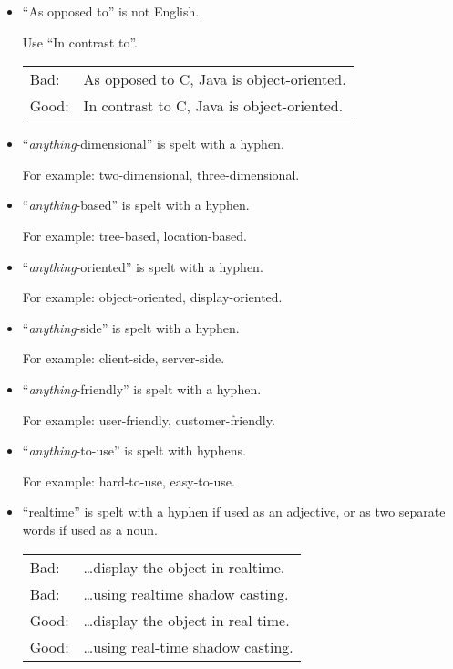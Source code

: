 \begin{itemize}
\item ``As opposed to'' is not English.

Use ``In contrast to''.

\begin{tabular}{lp{0.9\hsize}}
Bad:  & As opposed to C, Java is object-oriented. \\
Good: & In contrast to C, Java is object-oriented. \\
\end{tabular}


\item ``\emph{anything}-dimensional'' is spelt with a hyphen.

For example: two-dimensional, three-dimensional.



\item ``\emph{anything}-based'' is spelt with a hyphen.

For example: tree-based, location-based.



\item ``\emph{anything}-oriented'' is spelt with a hyphen.

For example: object-oriented, display-oriented.


\item ``\emph{anything}-side'' is spelt with a hyphen.

For example: client-side, server-side.


\item ``\emph{anything}-friendly'' is spelt with a hyphen.

For example: user-friendly, customer-friendly.


\item ``\emph{anything}-to-use'' is spelt with hyphens.

For example: hard-to-use, easy-to-use.



\item ``realtime'' is spelt with a hyphen if used as
  an adjective, or as two separate words if used as a noun.

\begin{tabular}{lp{0.9\hsize}}
Bad:  & \ldots display the object in realtime.  \\
Bad:  & \ldots using realtime shadow casting.   \\
Good: & \ldots display the object in real time. \\
Good: & \ldots using real-time shadow casting.  \\
\end{tabular}


\end{itemize}












